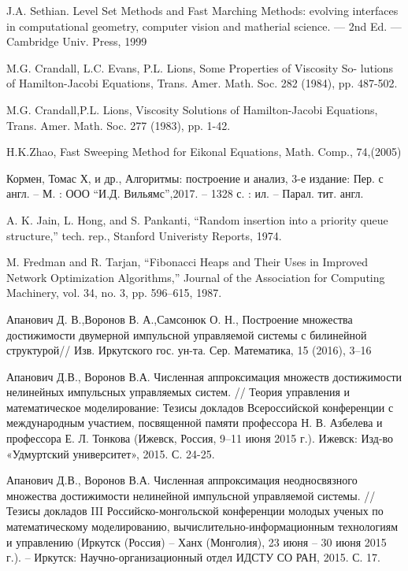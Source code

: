 \pagebreak
\begin{thebibliography}{99}

 {J.A. Sethian.} Level Set Methods and Fast Marching Methods: evolving
  interfaces in computational geometry, computer vision and matherial
  science. — 2nd Ed. — Cambridge Univ. Press, 1999

 {M.G. Crandall, L.C. Evans, P.L. Lions}, Some
  Properties of Viscosity So- lutions of Hamilton-Jacobi Equations,
  Trans. Amer. Math. Soc. 282 (1984), pp. 487-502.

 {M.G. Crandall,P.L. Lions}, Viscosity Solutions of
  Hamilton-Jacobi Equations, Trans. Amer. Math. Soc. 277 (1983),
  pp. 1-42.

 {H.K.Zhao}, Fast Sweeping Method for Eikonal Equations, Math. Comp.,
74,(2005)

 {Кормен, Томас Х, и др.}, Алгоритмы: построение и
  анализ, 3-е издание: Пер. с англ. -- М. : ООО
  ``И.Д. Вильямс'',2017. -- 1328 с. : ил. -- Парал. тит. англ.

 {A. K. Jain, L. Hong, and S. Pankanti}, “Random insertion into a priority queue
structure,” tech. rep., Stanford Univeristy Reports, 1974.


 {M. Fredman and R. Tarjan}, “Fibonacci Heaps and Their Uses in Improved
Network Optimization Algorithms,” Journal of the Association for Computing
Machinery, vol. 34, no. 3, pp. 596–615, 1987.

  
 {Апанович Д. В.,Воронов В. А.,Самсонюк О. Н.},
  Построение множества достижимости двумерной импульсной управляемой
  системы с билинейной структурой// Изв. Иркутского
  гос. ун-та. Сер. Математика, 15 (2016), 3–16

 Апанович Д.В., Воронов В.А. Численная аппроксимация
  множеств достижимости нелинейных импульсных управляемых систем. //
  Теория управления и математическое моделирование: Тезисы докладов
  Всероссийской конференции с международным участием, посвященной
  памяти профессора Н. В. Азбелева и профессора Е. Л. Тонкова (Ижевск,
  Россия, 9–11 июня 2015 г.). Ижевск: Изд-во «Удмуртский университет»,
  2015. С. 24-25.

 Апанович Д.В., Воронов В.А. Численная аппроксимация
  неодносвязного множества достижимости нелинейной импульсной
  управляемой системы. //  Тезисы докладов III Российско-монгольской
  конференции молодых ученых по математическому моделированию,
  вычислительно-информационным технологиям и управлению (Иркутск
  (Россия) – Ханх (Монголия), 23 июня – 30 июня 2015 г.). – Иркутск:
  Научно-организационный отдел ИДСТУ СО РАН, 2015. С. 17.


\end{thebibliography}
